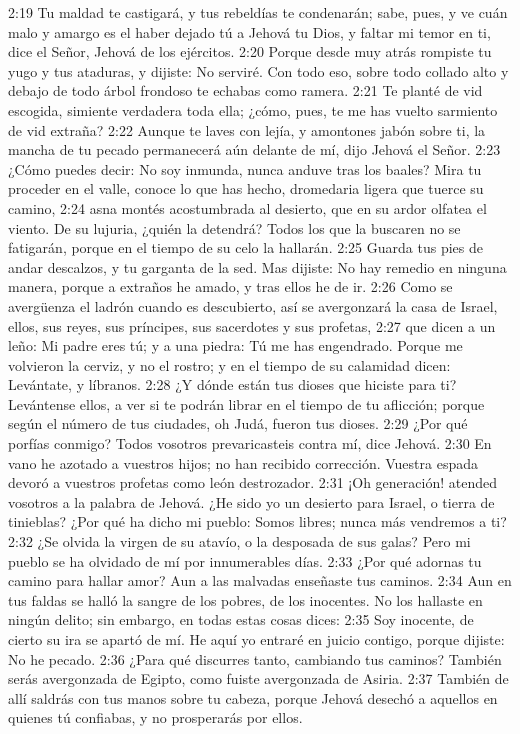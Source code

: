 2:19 Tu maldad te castigará, y tus rebeldías te condenarán; sabe, pues, y ve cuán malo y amargo es el haber dejado tú a Jehová tu Dios, y faltar mi temor en ti, dice el Señor, Jehová de los ejércitos. 
2:20 Porque desde muy atrás rompiste tu yugo y tus ataduras, y dijiste: No serviré. Con todo eso, sobre todo collado alto y debajo de todo árbol frondoso te echabas como ramera. 
2:21 Te planté de vid escogida, simiente verdadera toda ella; ¿cómo, pues, te me has vuelto sarmiento de vid extraña? 
2:22 Aunque te laves con lejía, y amontones jabón sobre ti, la mancha de tu pecado permanecerá aún delante de mí, dijo Jehová el Señor. 
2:23 ¿Cómo puedes decir: No soy inmunda, nunca anduve tras los baales? Mira tu proceder en el valle, conoce lo que has hecho, dromedaria ligera que tuerce su camino, 
2:24 asna montés acostumbrada al desierto, que en su ardor olfatea el viento. De su lujuria, ¿quién la detendrá? Todos los que la buscaren no se fatigarán, porque en el tiempo de su celo la hallarán. 
2:25 Guarda tus pies de andar descalzos, y tu garganta de la sed. Mas dijiste: No hay remedio en ninguna manera, porque a extraños he amado, y tras ellos he de ir. 
2:26 Como se avergüenza el ladrón cuando es descubierto, así se avergonzará la casa de Israel, ellos, sus reyes, sus príncipes, sus sacerdotes y sus profetas, 
2:27 que dicen a un leño: Mi padre eres tú; y a una piedra: Tú me has engendrado. Porque me volvieron la cerviz, y no el rostro; y en el tiempo de su calamidad dicen: Levántate, y líbranos. 
2:28 ¿Y dónde están tus dioses que hiciste para ti? Levántense ellos, a ver si te podrán librar en el tiempo de tu aflicción; porque según el número de tus ciudades, oh Judá, fueron tus dioses. 
2:29 ¿Por qué porfías conmigo? Todos vosotros prevaricasteis contra mí, dice Jehová. 
2:30 En vano he azotado a vuestros hijos; no han recibido corrección. Vuestra espada devoró a vuestros profetas como león destrozador. 
2:31 ¡Oh generación! atended vosotros a la palabra de Jehová. ¿He sido yo un desierto para Israel, o tierra de tinieblas? ¿Por qué ha dicho mi pueblo: Somos libres; nunca más vendremos a ti? 
2:32 ¿Se olvida la virgen de su atavío, o la desposada de sus galas? Pero mi pueblo se ha olvidado de mí por innumerables días. 
2:33 ¿Por qué adornas tu camino para hallar amor? Aun a las malvadas enseñaste tus caminos. 
2:34 Aun en tus faldas se halló la sangre de los pobres, de los inocentes. No los hallaste en ningún delito; sin embargo, en todas estas cosas dices: 
2:35 Soy inocente, de cierto su ira se apartó de mí. He aquí yo entraré en juicio contigo, porque dijiste: No he pecado. 
2:36 ¿Para qué discurres tanto, cambiando tus caminos? También serás avergonzada de Egipto, como fuiste avergonzada de Asiria. 
2:37 También de allí saldrás con tus manos sobre tu cabeza, porque Jehová desechó a aquellos en quienes tú confiabas, y no prosperarás por ellos. 
